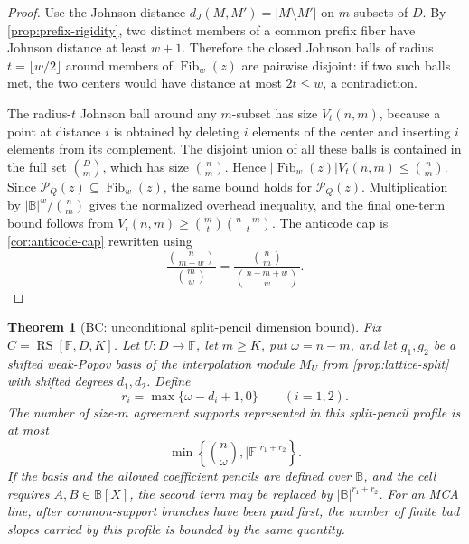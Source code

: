 \documentclass[a4paper,11pt]{amsart}
\newtheorem{theorem}{Theorem}[section]
\theoremstyle{remark}
\newcommand{\F}{\mathbb F}
\newcommand{\B}{\mathbb B}
\newcommand{\RS}{\operatorname{RS}}
\newcommand{\Fib}{\operatorname{Fib}}
\begin{document}
\begin{proof}
Use the Johnson distance \(d_J(M,M')=|M\setminus M'|\) on \(m\)-subsets of \(D\).  By \cref{prop:prefix-rigidity}, two distinct members of a common prefix fiber have Johnson distance at least \(w+1\).  Therefore the closed Johnson balls of radius \(t=\lfloor w/2\rfloor\) around members of \(\Fib_w(z)\) are pairwise disjoint: if two such balls met, the two centers would have distance at most \(2t\le w\), a contradiction.

The radius-\(t\) Johnson ball around any \(m\)-subset has size \(V_t(n,m)\), because a point at distance \(i\) is obtained by deleting \(i\) elements of the center and inserting \(i\) elements from its complement.  The disjoint union of all these balls is contained in the full set \(\binom Dm\), which has size \(\binom nm\).  Hence \(|\Fib_w(z)|V_t(n,m)\le\binom nm\).  Since \(\mathcal P_Q(z)\subseteq\Fib_w(z)\), the same bound holds for \(\mathcal P_Q(z)\).  Multiplication by \(|\B|^w/\binom nm\) gives the normalized overhead inequality, and the final one-term bound follows from \(V_t(n,m)\ge\binom mt\binom{n-m}{t}\).  The anticode cap is \cref{cor:anticode-cap} rewritten using
\[
        \frac{\binom{n}{m-w}}{\binom mw}=\frac{\binom nm}{\binom{n-m+w}{w}}.
\]
\end{proof}

\begin{theorem}[BC: unconditional split-pencil dimension bound]\label{thm:bc-proper}
Fix \(C=\RS[\F,D,K]\).  Let \(U:D\to\F\), let \(m\ge K\), put \(\omega=n-m\), and let \(g_1,g_2\) be a shifted weak-Popov basis of the interpolation module \(M_U\) from \cref{prop:lattice-split} with shifted degrees \(d_1,d_2\).  Define
\[
        r_i=\max\{\omega-d_i+1,0\}\qquad(i=1,2).
\]
The number of size-\(m\) agreement supports represented in this split-pencil profile is at most
\[
        \min\left\{\binom n\omega, |\F|^{r_1+r_2}\right\}.
\]
If the basis and the allowed coefficient pencils are defined over \(\B\), and the cell requires \(A,B\in\B[X]\), the second term may be replaced by \(|\B|^{r_1+r_2}\).  For an MCA line, after common-support branches have been paid first, the number of finite bad slopes carried by this profile is bounded by the same quantity.
\end{theorem}
\end{document}
